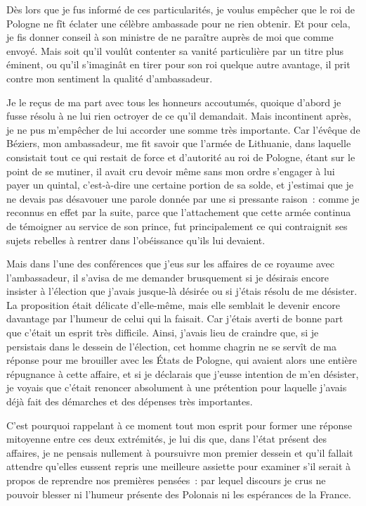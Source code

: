 \documentclass[french,twoside]{book} %
\begin{document}
Dès lors que je fus informé de ces particularités, je voulus empêcher que le roi de Pologne ne fît éclater une célèbre ambassade pour ne rien obtenir. Et pour cela, je fis donner conseil à son ministre de ne paraître auprès de moi que comme envoyé. Mais soit qu’il voulût contenter sa vanité particulière par un titre plus éminent, ou qu’il s’imaginât en tirer pour son roi quelque autre avantage, il prit contre mon sentiment la qualité d’ambassadeur.\par
Je le reçus de ma part avec tous les honneurs accoutumés, quoique d’abord je fusse résolu à ne lui rien octroyer de ce qu’il demandait. Mais incontinent après, je ne pus m’empêcher de lui accorder une somme très importante. Car l’évêque de Béziers, mon ambassadeur, me fit savoir que l’armée de Lithuanie, dans laquelle consistait tout ce qui restait de force et d’autorité au roi de Pologne, étant sur le point de se mutiner, il avait cru devoir même sans mon ordre s’engager à lui payer un quintal, c’est-à-dire une certaine portion de sa solde, et j’estimai que je ne devais pas désavouer une parole donnée par une si pressante raison : comme je reconnus en effet par la suite, parce que l’attachement que cette armée continua de témoigner au service de son prince, fut principalement ce qui contraignit ses sujets rebelles à rentrer dans l’obéissance qu’ils lui devaient.\par
Mais dans l’une des conférences que j’eus sur les affaires de ce royaume avec l’ambassadeur, il s’avisa de me demander brusquement si je désirais encore insister à l’élection que j’avais jusque-là désirée ou si j’étais résolu de me désister. La proposition était délicate d’elle-même, mais elle semblait le devenir encore davantage par l’humeur de celui qui la faisait. Car j’étais averti de bonne part que c’était un esprit très difficile. Ainsi, j’avais lieu de craindre que, si je persistais dans le dessein de l’élection, cet homme chagrin ne se servît de ma réponse pour me brouiller avec les États de Pologne, qui avaient alors une entière répugnance à cette affaire, et si je déclarais que j’eusse intention de m’en désister, je voyais que c’était renoncer absolument à une prétention pour laquelle j’avais déjà fait des démarches et des dépenses très importantes.\par
C’est pourquoi rappelant à ce moment tout mon esprit pour former une réponse mitoyenne entre ces deux extrémités, je lui dis que, dans l’état présent des affaires, je ne pensais nullement à poursuivre mon premier dessein et qu’il fallait attendre qu’elles eussent repris une meilleure assiette pour examiner s’il serait à propos de reprendre nos premières pensées : par lequel discours je crus ne pouvoir blesser ni l’humeur présente des Polonais ni les espérances de la France.\par
\end{document}
